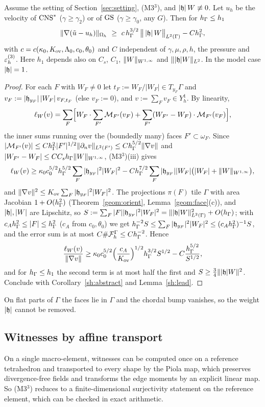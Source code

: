 \begin{theorem}\label{sh:lb}
Assume the setting of Section~\ref{sec:setting}, (M3$^3$), and $|\mathfrak h|\,W\not\equiv0$. Let $u_h$ be the velocity of $\mathrm{CNS}^\ast$ ($\gamma\ge\gamma_2$) or of $\mathrm{GS}$ ($\gamma\ge\gamma_0$, any $G$). Then for $h_\Gamma\le h_1$
\[
\norm{\nabla(\ut-u_h)}_{\Oh}\ \ge\ c\,\hG^{3/2}\,\bigl\|\,|\hh|\,W\bigr\|_{L^2(\Gamma)}-C\hG^2,
\]
with $c=c(\kappa_0,K_{\rm ov},\Lambda_0,c_0,\theta_0)$ and $C$ independent of $\gamma,\mu,\rho,h$, the pressure and $\varepsilon_h^{(3)}$. Here $h_1$ depends also on $C_s$, $C_1$, $\lVert W\rVert_{W^{1,\infty}}$ and $\lVert |\mathfrak h|W\rVert_{L^2}$. In the model case $|\mathfrak h|=1$.
\end{theorem}

\begin{proof}
For each $F$ with $W_F\ne0$ let $t_F:=W_F/|W_F|\in T_{y_F}\Gamma$ and $v_F:=|\mathfrak h_{y_F}|\,|W_F|\,v_{F,t_F}$ (else $v_F:=0$), and $v:=\sum_Fv_F\in Y_h^1$. By linearity,
\[
\ell_W(v)=\sum_F\Bigl[W_F\cdot\sum_{F'}\mathcal M_{F'}(v_F)+\sum_{F'}(W_{F'}-W_F)\cdot\mathcal M_{F'}(v_F)\Bigr],
\]
the inner sums running over the (boundedly many) faces $F'\subset\omega_F$. Since $|\mathcal M_{F'}(v)|\le Ch_\Gamma^2|F'|^{1/2}\lVert \partial_n v\rVert_{L^2(F')}\le Ch_\Gamma^{5/2}\lVert \nabla v\rVert$ and $|W_{F'}-W_F|\le CC_sh_\Gamma\lVert W\rVert_{W^{1,\infty}}$, (M3$^3$)(iii) gives
\[
\ell_W(v)\ge\kappa_0c_0^{5/2}h_\Gamma^{5/2}\sum_F|\mathfrak h_{y_F}|^2|W_F|^2-Ch_\Gamma^{7/2}\sum_F|\mathfrak h_{y_F}||W_F|\bigl(|W_F|+\lVert W\rVert_{W^{1,\infty}}\bigr),
\]
and $\lVert \nabla v\rVert^2\le K_{\rm ov}\sum_F|\mathfrak h_{y_F}|^2|W_F|^2$. The projections $\pi(F)$ tile $\Gamma$ with area Jacobian $1+O(h_\Gamma^2)$ (Theorem~\ref{geom:orient}, Lemma~\ref{geom:face}(c)), and $|\mathfrak h|,|W|$ are Lipschitz, so $S:=\sum_F|F||\mathfrak h_{y_F}|^2|W_F|^2=\lVert |\mathfrak h|W\rVert^2_{L^2(\Gamma)}+O(h_\Gamma)$; with $c_Ah_\Gamma^2\le|F|\le h_\Gamma^2$ ($c_A$ from $c_0,\theta_0$) we get $h_\Gamma^{-2}S\le\sum_F|\mathfrak h_{y_F}|^2|W_F|^2\le(c_Ah_\Gamma^2)^{-1}S$, and the error sum is at most $C\#\mathcal F_h^\Gamma\le Ch_\Gamma^{-2}$. Hence
\[
\frac{\ell_W(v)}{\lVert \nabla v\rVert}\ge\kappa_0c_0^{5/2}\Bigl(\frac{c_A}{K_{\rm ov}}\Bigr)^{1/2}h_\Gamma^{3/2}S^{1/2}-C\frac{h_\Gamma^{5/2}}{S^{1/2}},
\]
and for $h_\Gamma\le h_1$ the second term is at most half the first and $S\ge\frac34\lVert |\mathfrak h|W\rVert^2$. Conclude with Corollary~\ref{sh:abstract} and Lemma~\ref{sh:lead}.
\end{proof}

On flat parts of $\Gamma$ the faces lie in $\Gamma$ and the chordal bump vanishes, so the weight $|\mathfrak h|$ cannot be removed.

\subsection{Witnesses by affine transport}\label{sh:sec:transport}
On a single macro-element, witnesses can be computed once on a reference tetrahedron and transported to every shape by the Piola map, which preserves divergence-free fields and transforms the edge moments by an explicit linear map. So (M3$^3$) reduces to a finite-dimensional surjectivity statement on the reference element, which can be checked in exact arithmetic.

